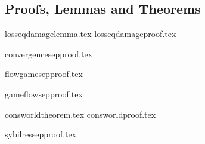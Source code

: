     \subsection{Proofs, Lemmas and Theorems}
    {losseqdamagelemma.tex}
    {losseqdamageproof.tex}

    {convergencesepproof.tex}

    {flowgamesepproof.tex}

    {gameflowsepproof.tex}

    {consworldtheorem.tex}
    {consworldproof.tex}

    {sybilressepproof.tex}

